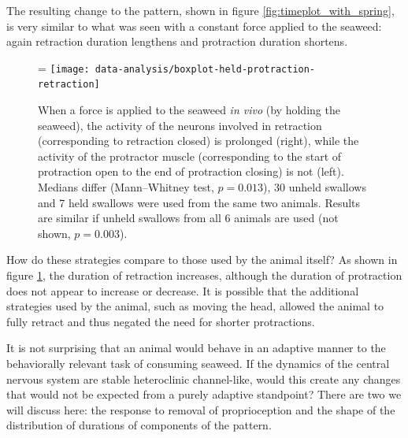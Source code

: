 The resulting change to the pattern, shown in figure \ref{fig:timeplot_with_spring},
is very similar to what was seen with a constant force applied to the seaweed:
again retraction duration lengthens and protraction duration shortens.

\begin{figure}
    \ifthesis
        \linewidth
    \else
        \figwidth=\linewidth
    \fi
    \centering
    \texttt{[image: data-analysis/boxplot-held-protraction-retraction]}
    \caption[Effects of held seaweed \textit{in vivo}]{
        When a force is applied to the seaweed \textit{in vivo} (by holding
        the seaweed), the activity of the neurons involved in retraction
        (corresponding to retraction closed) is prolonged (right), while the
        activity of the protractor muscle (corresponding to the start of
        protraction open to the end of protraction closing) is not (left).
        Medians differ (Mann--Whitney test, $p = 0.013$), 30 unheld swallows
        and 7 held swallows were used from the same two animals.  Results are
        similar if unheld swallows from all 6 animals are used (not shown, $p =
        0.003$).}
    \label{fig:boxplots_held}
\end{figure}

How do these strategies compare to those used by the animal itself?  As shown in
figure \ref{fig:boxplots_held}, the duration of retraction increases, although
the duration of protraction does not appear to increase or decrease.  It is possible
that the additional strategies used by the animal, such as moving the head, allowed
the animal to fully retract and thus negated the need for shorter protractions.

It is not surprising that an animal would behave in an adaptive manner to the
behaviorally relevant task of consuming seaweed.  If the dynamics of the
central nervous system are stable heteroclinic channel-like, would this create any changes that would
not be expected from a purely adaptive standpoint?  There are two we will discuss
here: the response to removal of proprioception and the shape of the distribution
of durations of components of the pattern.

